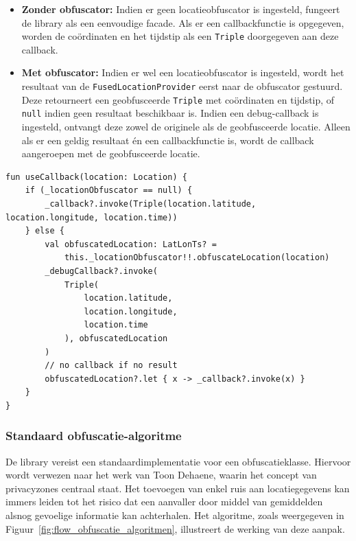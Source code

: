 \begin{itemize}
    \item \textbf{Zonder obfuscator:} Indien er geen locatieobfuscator is ingesteld, fungeert de library als een eenvoudige facade. Als er een callbackfunctie is opgegeven, worden de coördinaten en het tijdstip als een \texttt{Triple} doorgegeven aan deze callback.
    \item \textbf{Met obfuscator:} Indien er wel een locatieobfuscator is ingesteld, wordt het resultaat van de \texttt{FusedLocationProvider} eerst naar de obfuscator gestuurd. Deze retourneert een geobfusceerde \texttt{Triple} met coördinaten en tijdstip, of \texttt{null} indien geen resultaat beschikbaar is. Indien een debug-callback is ingesteld, ontvangt deze zowel de originele als de geobfusceerde locatie. Alleen als er een geldig resultaat én een callbackfunctie is, wordt de callback aangeroepen met de geobfusceerde locatie.
\end{itemize}
\begin{verbatim}
fun useCallback(location: Location) {
    if (_locationObfuscator == null) {
        _callback?.invoke(Triple(location.latitude, location.longitude, location.time))
    } else {
        val obfuscatedLocation: LatLonTs? =
            this._locationObfuscator!!.obfuscateLocation(location)
        _debugCallback?.invoke(
            Triple(
                location.latitude,
                location.longitude,
                location.time
            ), obfuscatedLocation
        )
        // no callback if no result
        obfuscatedLocation?.let { x -> _callback?.invoke(x) }
    }
}
\end{verbatim}
\subsubsection{Standaard obfuscatie-algoritme}
De library vereist een standaardimplementatie voor een obfuscatieklasse. Hiervoor wordt verwezen naar het werk van Toon Dehaene, waarin het concept van privacyzones centraal staat. Het toevoegen van enkel ruis aan locatiegegevens kan immers leiden tot het risico dat een aanvaller door middel van gemiddelden alsnog gevoelige informatie kan achterhalen. Het algoritme, zoals weergegeven in Figuur~\ref{fig:flow_obfuscatie_algoritmen}, illustreert de werking van deze aanpak.

